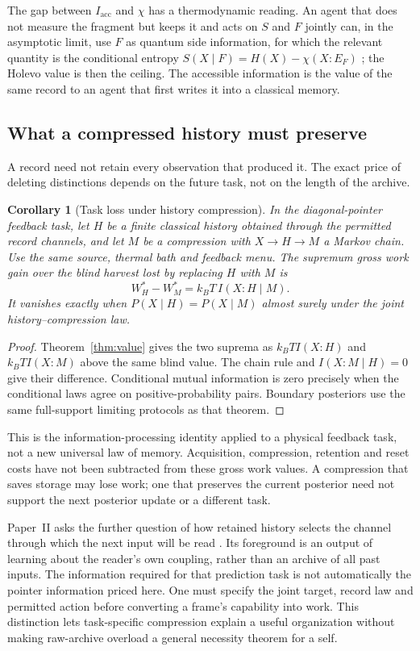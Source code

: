 \documentclass[12pt]{article}
\newtheorem{corollary}[theorem]{Corollary}
\begin{document}
The gap between $I_{\mathrm{acc}}$ and $\chi$ has a thermodynamic reading. An agent that does not measure the fragment but keeps it and acts on $S$ and $F$ jointly can, in the asymptotic limit, use $F$ as quantum side information, for which the relevant quantity is the conditional entropy $S(X\mid F)=H(X)-\chi(X{:}E_F)$ \cite{delRio2011}; the Holevo value is then the ceiling. The accessible information is the value of the same record to an agent that first writes it into a classical memory.

\subsection{What a compressed history must preserve}

A record need not retain every observation that produced it.
The exact price of deleting distinctions depends on the future task,
not on the length of the archive.

\begin{corollary}[Task loss under history compression]
\label{cor:history-compression}
In the diagonal-pointer feedback task, let $H$ be a finite classical
history obtained through the permitted record channels, and let $M$
be a compression with $X\to H\to M$ a Markov chain.
Use the same source, thermal bath and feedback menu.
The supremum gross work gain over the blind harvest lost by replacing
$H$ with $M$ is
\[
 W_H^*-W_M^*=k_BT\,I(X:H\mid M).
\]
It vanishes exactly when $P(X\mid H)=P(X\mid M)$ almost surely
under the joint history--compression law.
\end{corollary}
\begin{proof}
Theorem~\ref{thm:value} gives the two suprema as
$k_BT I(X:H)$ and $k_BT I(X:M)$ above the same blind value.
The chain rule and $I(X:M\mid H)=0$ give their difference.
Conditional mutual information is zero precisely when the conditional
laws agree on positive-probability pairs. Boundary posteriors use the
same full-support limiting protocols as that theorem.
\end{proof}

This is the information-processing identity applied to a physical
feedback task, not a new universal law of memory. Acquisition,
compression, retention and reset costs have not been subtracted from
these gross work values. A compression that saves storage may lose
work; one that preserves the current posterior need not support the
next posterior update or a different task.

Paper~II asks the further question of how retained history selects
the channel through which the next input will be read
\cite{Liu2026TDOME_II}. Its foreground is an output of learning about
the reader's own coupling, rather than an archive of all past inputs.
The information required for that prediction task is not automatically
the pointer information priced here. One must specify the joint target,
record law and permitted action before converting a frame's capability
into work. This distinction lets task-specific compression explain
a useful organization without making raw-archive overload a general
necessity theorem for a self.
\end{document}
